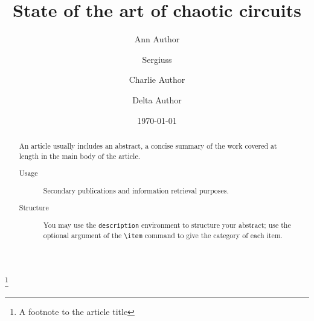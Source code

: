 \documentclass[%
 reprint,
 amsmath,amssymb,
 aps,
]{revtex4-2}
\begin{document}

\title{State of the art of chaotic circuits}%
\thanks{A footnote to the article title}%

\author{Ann Author}
\author{Sergiuss}%
%


\author{Charlie Author}
%
%
\author{Delta Author}
%


\date{\today}%

\begin{abstract}
An article usually includes an abstract, a concise summary of the work
covered at length in the main body of the article. 
\begin{description}
\item[Usage]
Secondary publications and information retrieval purposes.
\item[Structure]
You may use the \texttt{description} environment to structure your abstract;
use the optional argument of the \verb+\item+ command to give the category of each item. 
\end{description}
\end{abstract}

\maketitle
\end{document}

